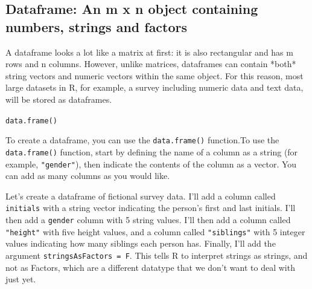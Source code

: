 \documentclass{tufte-book}\usepackage[]{graphicx}\usepackage[]{color}
\newcommand{\newfun}[1]{\begin{LARGE} \begin{center} \texttt{#1} \end{center} \end{LARGE}}
\begin{document}
\subsection{Dataframe: An m x n object containing numbers, strings and factors}

A dataframe looks a lot like a matrix at first: it is also rectangular and has m rows and n columns. However, unlike matrices, dataframes can contain *both* string vectors and numeric vectors within the same object. For this reason, most large datasets in R, for example, a survey including numeric data and text data, will be stored as dataframes.


\newfun{data.frame()}

To create a dataframe, you can use the \texttt{data.frame()} function.To use the \texttt{data.frame()} function, start by defining the name of a column as a string (for example, \texttt{"gender"}), then indicate the contents of the column as a vector. You can add as many columns as you would like.

Let's create a dataframe of fictional survey data. I'll add a column called \texttt{initials} with a string vector indicating the person's first and last initials. I'll then add a \texttt{gender} column with 5 string values. I'll then add a column called \texttt{"height"} with five height values, and a column called \texttt{"siblings"} with 5 integer values indicating how many siblings each person has. Finally, I'll add the argument \texttt{stringsAsFactors = F}. This tells R to interpret strings as strings, and not as Factors, which are a different datatype that we don't want to deal with just yet.
\end{document}

